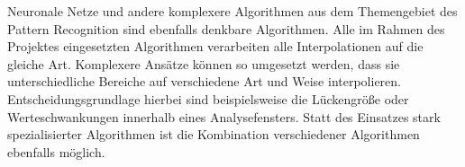 Neuronale Netze und andere komplexere Algorithmen aus dem Themengebiet des Pattern Recognition sind ebenfalls denkbare Algorithmen. Alle im Rahmen des Projektes eingesetzten Algorithmen verarbeiten alle Interpolationen auf die gleiche Art. Komplexere Ansätze können so umgesetzt werden, dass sie unterschiedliche Bereiche auf verschiedene Art und Weise interpolieren. Entscheidungsgrundlage hierbei sind beispielsweise die Lückengröße oder Werteschwankungen innerhalb eines Analysefensters.
Statt des Einsatzes stark spezialisierter Algorithmen ist die Kombination verschiedener Algorithmen ebenfalls möglich.
